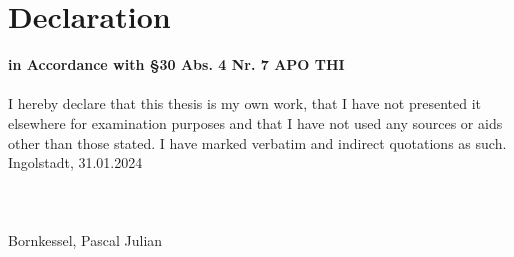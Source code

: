 \cleardoublepage
\setlength{\parindent}{0pt}
\setlength{\parskip}{10pt}	

\chapter*{Declaration}
\vspace{-40pt} %
\hspace{0.02pt} {\normalsize \textbf{in Accordance with §30 Abs. 4 Nr. 7 APO THI}} \\ \\


I hereby declare that this thesis is my own work, that I have not presented it elsewhere
for examination purposes and that I have not used any sources or aids other than those
stated. I have marked verbatim and indirect quotations as such. \\


Ingolstadt, 31.01.2024 \\ \\ \\ \\



\small Bornkessel, Pascal Julian
